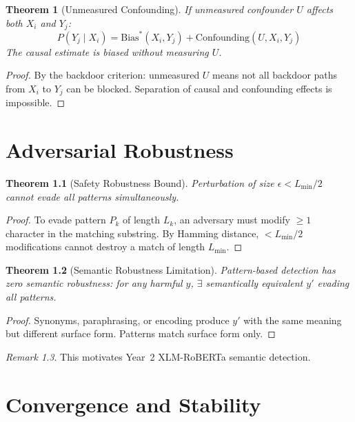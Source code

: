 \documentclass[12pt,a4paper]{report}
\theoremstyle{plain}
\newtheorem{theorem}{Theorem}[chapter]
\theoremstyle{definition}
\theoremstyle{remark}
\newtheorem{remark}[theorem]{Remark}
\newcommand{\truebias}{\text{Bias}^*}
\begin{document}
\begin{theorem}[Unmeasured Confounding]
If unmeasured confounder $U$ affects both
$X_i$ and $Y_j$:
\begin{equation}
    P(Y_j \mid X_i)
    = \truebias(X_i, Y_j)
    + \text{Confounding}(U, X_i, Y_j)
\end{equation}
The causal estimate is biased without measuring $U$.
\end{theorem}
\begin{proof}
By the backdoor criterion: unmeasured $U$
means not all backdoor paths from $X_i$ to $Y_j$
can be blocked. Separation of causal and confounding
effects is impossible.
\end{proof}

\chapter{Adversarial Robustness}
\label{ch:robust}

\begin{theorem}[Safety Robustness Bound]
Perturbation of size $\epsilon < L_{\min}/2$ cannot
evade all patterns simultaneously.
\end{theorem}
\begin{proof}
To evade pattern $P_k$ of length $L_k$, an adversary
must modify $\geq 1$ character in the matching substring.
By Hamming distance, $< L_{\min}/2$ modifications
cannot destroy a match of length $L_{\min}$.
\end{proof}

\begin{theorem}[Semantic Robustness Limitation]
Pattern-based detection has zero semantic robustness:
for any harmful $y$, $\exists$ semantically equivalent
$y'$ evading all patterns.
\end{theorem}
\begin{proof}
Synonyms, paraphrasing, or encoding produce $y'$ with
the same meaning but different surface form. Patterns
match surface form only.
\end{proof}

\begin{remark}
This motivates Year~2 XLM-RoBERTa semantic detection.
\end{remark}

\chapter{Convergence and Stability}
\label{ch:stability}
\end{document}

